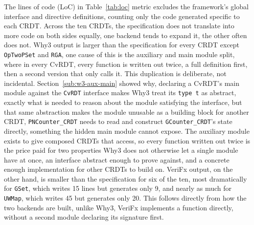 The lines of code (LoC) in Table~\ref{tab:loc} metric excludes the framework's global interface and directive definitions, counting only the code generated
specific to each CRDT. Across the ten CRDTs, the specification does not translate into more code on both sides equally, one backend tends to
expand it, the other often does not. Why3 output is larger than the specification for every CRDT except \texttt{OpTwoPSet}
and \texttt{RGA}, one cause of this is the auxiliary and main module split, where in every CvRDT, every function is
written out twice, a full definition first, then a second version that only calls it. This duplication is deliberate,
not incidental. Section~\ref{sub:w3-aux-main} showed why, declaring a CvRDT's main module against the \texttt{CvRDT}
interface makes Why3 treat its \texttt{type t} as abstract, exactly what is needed to reason about the module satisfying
the interface, but that same abstraction makes the module unusable as a building block for another CRDT, \texttt{PNCounter\_CRDT}
needs to read and construct \texttt{GCounter\_CRDT}'s state directly, something the hidden main module cannot expose. The
auxiliary module exists to give composed CRDTs that access, so every function written out twice is the price paid for
two properties Why3 does not otherwise let a single module have at once, an interface abstract enough to prove against,
and a concrete enough implementation for other CRDTs to build on. VeriFx output, on the other hand,
is smaller than the specification for six of the ten, most dramatically for \texttt{GSet}, which writes 15 lines but
generates only 9, and nearly as much for \texttt{UWMap}, which writes 45 but generates only 20. This follows directly
from how the two backends are built, unlike Why3, VeriFx implements a function directly, without a second module declaring
its signature first.

